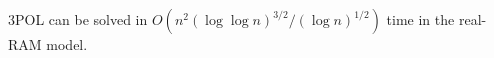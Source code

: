 \begin{contribution}[label=thm:implicit:uniform,restate=TheoremPOLUniformImplicit]%
3POL can be solved in
$O(n^2 {(\log \log n)}^{3/2} / {(\log n)}^{1/2})$
time in the real-RAM model.
\end{contribution}

